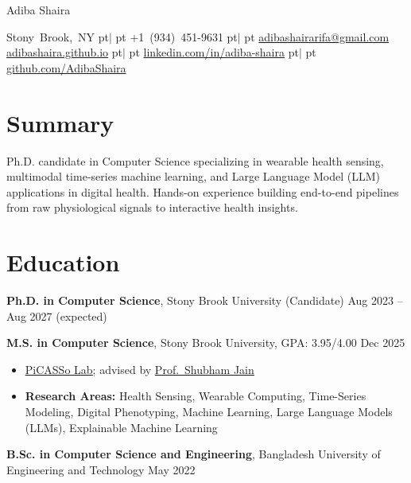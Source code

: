 \documentclass[10pt, letterpaper]{article}
\newenvironment{highlights}{
    \begin{itemize}[
        topsep=0.06 cm,
        parsep=0.04 cm,
        partopsep=0pt,
        itemsep=0pt,
        leftmargin=10pt
    ]
}{
    \end{itemize}
}
\newcommand{\entry}[2]{\par\noindent #1 \hfill #2\par}
\newcommand{\sep}{\kern 5.0 pt$|$\kern 5.0 pt}
\newenvironment{header}{
    \setlength{\topsep}{0pt}\par\kern\topsep\centering\linespread{1.35}
}{
    \par\kern\topsep
}
\let\hrefWithoutArrow\href
\begin{document}
\begin{header}
    \fontsize{25 pt}{25 pt}\selectfont Adiba Shaira

    \vspace{3 pt}

    \normalsize
    \mbox{Stony Brook, NY}\sep%
    \mbox{+1 (934) 451-9631}\sep%
    \mbox{\hrefWithoutArrow{mailto:adibashairarifa@gmail.com}{adibashairarifa@gmail.com}}%
    \\
    \mbox{\hrefWithoutArrow{https://adibashaira.github.io}{adibashaira.github.io}}\sep%
    \mbox{\hrefWithoutArrow{https://linkedin.com/in/adiba-shaira}{linkedin.com/in/adiba-shaira}}\sep%
    \mbox{\hrefWithoutArrow{https://github.com/AdibaShaira}{github.com/AdibaShaira}}%
\end{header}

\vspace{-0.2 cm}

\section{Summary}
Ph.D. candidate in Computer Science specializing in wearable health sensing, multimodal time-series machine learning, and Large Language Model (LLM) applications in digital health. Hands-on experience building end-to-end pipelines from raw physiological signals to interactive health insights.

\section{Education}

\entry{\textbf{Ph.D. in Computer Science}, Stony Brook University (Candidate)}{Aug 2023 -- Aug 2027 (expected)}
\entry{\textbf{M.S. in Computer Science}, Stony Brook University, GPA: 3.95/4.00}{Dec 2025}
\begin{highlights}
    \item \href{https://picasso.cs.stonybrook.edu/}{\underline{PiCASSo Lab}}; advised by \href{https://www3.cs.stonybrook.edu/~jain/}{\underline{Prof.\ Shubham Jain}}
    \item \textbf{Research Areas:} Health Sensing, Wearable Computing, Time-Series Modeling, Digital Phenotyping, Machine Learning, Large Language Models (LLMs), Explainable Machine Learning
\end{highlights}
\entry{\textbf{B.Sc. in Computer Science and Engineering}, Bangladesh University of Engineering and Technology}{May 2022}
\end{document}
